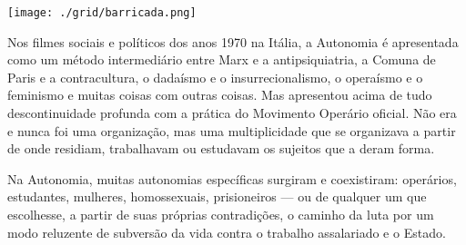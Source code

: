 \hspace*{-.4cm}\begin{minipage}[c]{1\linewidth}
\small{
{}}
\end{minipage}

\pagebreak %

\begin{center}
\hspace*{.5cm}\texttt{[image: ./grid/barricada.png]}
\end{center}

\hspace*{-7cm}\hrulefill\hspace*{-7cm}

\medskip

\noindent{}Nos filmes sociais e políticos dos anos 1970 na Itália, a Autonomia é apresentada como um método intermediário entre Marx e a antipsiquiatria, a Comuna de Paris e a contracultura, o dadaísmo e o insurrecionalismo, o operaísmo e o feminismo e muitas coisas com outras coisas. Mas apresentou acima de tudo descontinuidade profunda com a prática do Movimento Operário oficial. Não era e nunca foi uma organização, mas uma multiplicidade que se organizava a partir de onde residiam, trabalhavam ou estudavam os sujeitos que a deram forma.

Na Autonomia, muitas autonomias específicas surgiram e coexistiram: operários, estudantes, mulheres, homossexuais, prisioneiros --- ou de qualquer um que escolhesse, a partir de suas próprias contradições, o caminho da luta por um modo reluzente de subversão da vida contra o trabalho assalariado e o Estado.  

